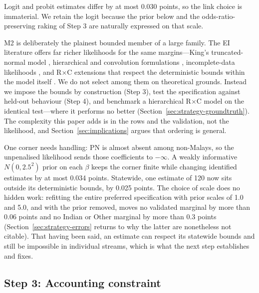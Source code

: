 \documentclass[11pt]{article}
\begin{document}
Logit and probit estimates differ by at most 0.030 points, so the link choice is immaterial. We retain the logit because the prior below and the odds-ratio-preserving raking of Step 3 are naturally expressed on that scale.

M2 is deliberately the plainest bounded member of a large family. The EI literature offers far richer likelihoods for the same margins---King's truncated-normal model \cite{king1997}, hierarchical and convolution formulations \cite{wakefield2004}, incomplete-data likelihoods \cite{imailustrauss2008}, and R$\times$C extensions that respect the deterministic bounds within the model itself \cite{rosen2001,greinerquinn2009}. We do not select among them on theoretical grounds. Instead we impose the bounds by construction (Step 3), test the specification against held-out behaviour (Step 4), and benchmark a hierarchical R$\times$C model on the identical test---where it performs no better (Section~\ref{sec:strategy-groundtruth}). The complexity this paper adds is in the rows and the validation, not the likelihood, and Section~\ref{sec:implications} argues that ordering is general.

One corner needs handling: PN is almost absent among non-Malays, so the unpenalised likelihood sends those coefficients to $-\infty$. A weakly informative $N(0,2.5^2)$ prior on each $\beta$ \cite{gelman2008} keeps the corner finite while changing identified estimates by at most 0.034 points. Statewide, one estimate of 120 now sits outside its deterministic bounds, by 0.025 points. The choice of scale does no hidden work: refitting the entire preferred specification with prior scales of 1.0 and 5.0, and with the prior removed, moves no validated marginal by more than 0.06 points and no Indian or Other marginal by more than 0.3 points (Section~\ref{sec:strategy-errors} returns to why the latter are nonetheless not citable). That having been said, an estimate can respect its statewide bounds and still be impossible in individual streams, which is what the next step establishes and fixes.

\subsection{Step 3: Accounting constraint}
\label{sec:strategy-rake}
\end{document}

